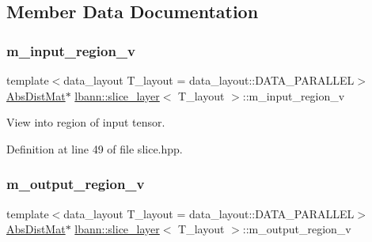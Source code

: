 \subsection{Member Data Documentation}
\mbox{\label{classlbann_1_1slice__layer_a3e64f86a9e999d3d72867c6009aa99ba}} 
\subsubsection{\texorpdfstring{m\+\_\+input\+\_\+region\+\_\+v}{m\_input\_region\_v}}
{\footnotesize\ttfamily template$<$data\+\_\+layout T\+\_\+layout = data\+\_\+layout\+::\+D\+A\+T\+A\+\_\+\+P\+A\+R\+A\+L\+L\+EL$>$ \\
\hyperlink{base_8hpp_a9a697a504ae84010e7439ffec862b470}{Abs\+Dist\+Mat}$\ast$ \hyperlink{classlbann_1_1slice__layer}{lbann\+::slice\+\_\+layer}$<$ T\+\_\+layout $>$\+::m\+\_\+input\+\_\+region\+\_\+v\hspace{0.3cm}{\ttfamily [private]}}

View into region of input tensor. 

Definition at line 49 of file slice.\+hpp.

\mbox{\label{classlbann_1_1slice__layer_a9d72208fc8136641e91cb208c38f8b65}} 
\subsubsection{\texorpdfstring{m\+\_\+output\+\_\+region\+\_\+v}{m\_output\_region\_v}}
{\footnotesize\ttfamily template$<$data\+\_\+layout T\+\_\+layout = data\+\_\+layout\+::\+D\+A\+T\+A\+\_\+\+P\+A\+R\+A\+L\+L\+EL$>$ \\
\hyperlink{base_8hpp_a9a697a504ae84010e7439ffec862b470}{Abs\+Dist\+Mat}$\ast$ \hyperlink{classlbann_1_1slice__layer}{lbann\+::slice\+\_\+layer}$<$ T\+\_\+layout $>$\+::m\+\_\+output\+\_\+region\+\_\+v\hspace{0.3cm}{\ttfamily [private]}}

